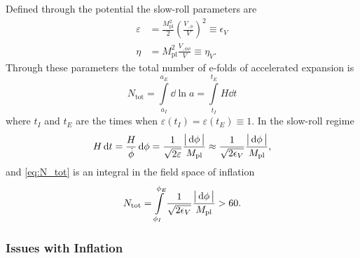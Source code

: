 %
Defined through the potential the slow-roll parameters are
%
\begin{subequations}
	\begin{align}
		\varepsilon & = \frac{M_{\text{pl}}^{2}}{2} {\left( \frac{V_{,\phi}}{V} \right)}^{2} \equiv \epsilon_{V} \\
		\eta        & = M_{\text{pl}}^{2} \frac{V_{,\phi\phi}}{V} \equiv \eta_{V}.
	\end{align}
\end{subequations}
%
Through these parameters the total number of e-folds of accelerated expansion is
%
\begin{equation}\label{eq:N_tot}
	N_{\text{tot}}
	= \int\limits_{a_{I}}^{a_{E}} \dd{\ln{a}}
	= \int\limits_{t_{I}}^{t_{E}} H \dd{t}
\end{equation}
%
where \(t_{I}\) and \(t_{E}\) are the times when \(\varepsilon(t_{I}) = \varepsilon(t_{E}) \equiv 1\).
In the slow-roll regime
%
\begin{equation}
	H \dd{t}
	= \frac{H}{\dot{\phi}} \dd{\phi}
	= \frac{1}{\sqrt{2\varepsilon}} \frac{\big\lvert\dd{\phi}\big\rvert}{M_{\text{pl}}}
	\approx \frac{1}{\sqrt{2\epsilon_{V}}} \frac{\big\lvert\dd{\phi}\big\rvert}{M_{\text{pl}}},
\end{equation}
%
and \cref{eq:N_tot} is an integral in the field space of inflation
\begin{equation}
	N_{\text{tot}}
	= \int\limits_{\phi_{I}}^{\phi_{E}}  \frac{1}{\sqrt{2\epsilon_{V}}} \frac{\big\lvert\dd{\phi}\big\rvert}{M_{\text{pl}}}
	> 60.
\end{equation}

\subsubsection{Issues with Inflation}


